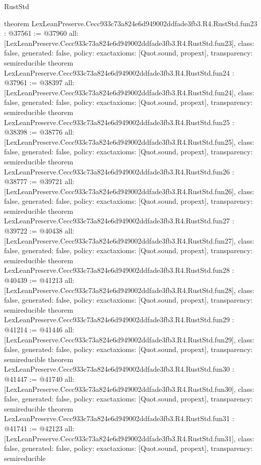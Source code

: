 \begin{lexlean}{RustStd}
\begin{coremodule}
{}
theorem LexLeanPreserve.Cecc933c73a824e6d949002ddfade3fb3.R4.RustStd.fun23 : @37561 := @37960 {
  all: [LexLeanPreserve.Cecc933c73a824e6d949002ddfade3fb3.R4.RustStd.fun23],
  class: false,
  generated: false,
  policy: exact{axioms: [Quot.sound, propext]},
  transparency: semireducible
}
theorem LexLeanPreserve.Cecc933c73a824e6d949002ddfade3fb3.R4.RustStd.fun24 : @37961 := @38397 {
  all: [LexLeanPreserve.Cecc933c73a824e6d949002ddfade3fb3.R4.RustStd.fun24],
  class: false,
  generated: false,
  policy: exact{axioms: [Quot.sound, propext]},
  transparency: semireducible
}
theorem LexLeanPreserve.Cecc933c73a824e6d949002ddfade3fb3.R4.RustStd.fun25 : @38398 := @38776 {
  all: [LexLeanPreserve.Cecc933c73a824e6d949002ddfade3fb3.R4.RustStd.fun25],
  class: false,
  generated: false,
  policy: exact{axioms: [Quot.sound, propext]},
  transparency: semireducible
}
theorem LexLeanPreserve.Cecc933c73a824e6d949002ddfade3fb3.R4.RustStd.fun26 : @38777 := @39721 {
  all: [LexLeanPreserve.Cecc933c73a824e6d949002ddfade3fb3.R4.RustStd.fun26],
  class: false,
  generated: false,
  policy: exact{axioms: [Quot.sound, propext]},
  transparency: semireducible
}
theorem LexLeanPreserve.Cecc933c73a824e6d949002ddfade3fb3.R4.RustStd.fun27 : @39722 := @40438 {
  all: [LexLeanPreserve.Cecc933c73a824e6d949002ddfade3fb3.R4.RustStd.fun27],
  class: false,
  generated: false,
  policy: exact{axioms: [Quot.sound, propext]},
  transparency: semireducible
}
theorem LexLeanPreserve.Cecc933c73a824e6d949002ddfade3fb3.R4.RustStd.fun28 : @40439 := @41213 {
  all: [LexLeanPreserve.Cecc933c73a824e6d949002ddfade3fb3.R4.RustStd.fun28],
  class: false,
  generated: false,
  policy: exact{axioms: [Quot.sound, propext]},
  transparency: semireducible
}
theorem LexLeanPreserve.Cecc933c73a824e6d949002ddfade3fb3.R4.RustStd.fun29 : @41214 := @41446 {
  all: [LexLeanPreserve.Cecc933c73a824e6d949002ddfade3fb3.R4.RustStd.fun29],
  class: false,
  generated: false,
  policy: exact{axioms: [Quot.sound, propext]},
  transparency: semireducible
}
theorem LexLeanPreserve.Cecc933c73a824e6d949002ddfade3fb3.R4.RustStd.fun30 : @41447 := @41740 {
  all: [LexLeanPreserve.Cecc933c73a824e6d949002ddfade3fb3.R4.RustStd.fun30],
  class: false,
  generated: false,
  policy: exact{axioms: [Quot.sound, propext]},
  transparency: semireducible
}
theorem LexLeanPreserve.Cecc933c73a824e6d949002ddfade3fb3.R4.RustStd.fun31 : @41741 := @42123 {
  all: [LexLeanPreserve.Cecc933c73a824e6d949002ddfade3fb3.R4.RustStd.fun31],
  class: false,
  generated: false,
  policy: exact{axioms: [Quot.sound, propext]},
  transparency: semireducible
}
\end{coremodule}
\end{lexlean}
